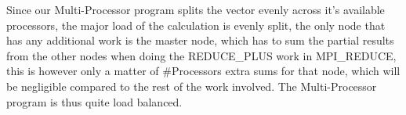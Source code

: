 Since our Multi-Processor program splits the vector evenly across it's available processors, the major load of the calculation is evenly split, the only node that has any additional work is the master node, which has to sum the partial results from the other nodes when doing the REDUCE\_PLUS work in MPI\_REDUCE, this is however only a matter of \#Processors extra sums for that node, which will be negligible compared to the rest of the work involved. The Multi-Processor program is thus quite load balanced.

